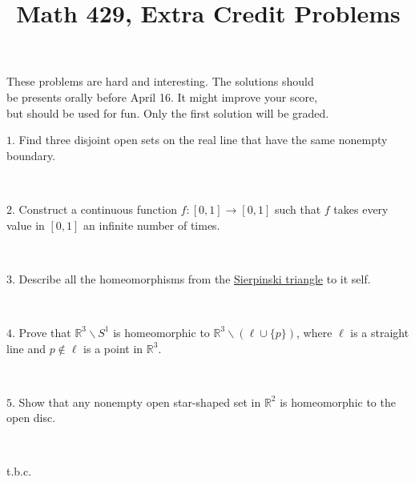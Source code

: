 \documentclass{article}
\def\noi{\noindent}%
\def\RR{\mathbb{R}}%
\def\:{\colon}
\begin{document}
\title{Math 429, Extra Credit Problems}
\author{}
\date{}
\maketitle

\begin{center}
{\small These problems are hard and interesting.
The solutions should \\
be presents orally before April 16.
It might improve your score,\\
but should be used for fun. Only the first solution will be graded.}
\end{center}
\thispagestyle{empty}




\noi $1$. 
Find three disjoint open sets on the real line 
that have the same nonempty boundary. 

\ 

\noi $2$. Construct a continuous function 
$f\:[0,1]\rightarrow [0,1]$ such that $f$ takes every value in $[0,1]$ 
an infinite number of times.

\ 

\noi $3$.
Describe all the homeomorphisms from the \href{http://en.wikipedia.org/wiki/Sierpinski_triangle}{Sierpinski triangle} to it self.

\ 

\noi $4$. Prove that $\RR^3\backslash S^1$ is homeomorphic to $\RR^3\backslash (\ell\cup \{p\})$, where $\ell$ is a straight line and $p\not\in\ell$ is a point in $\RR^3$.


\ 


\noi $5.$ Show that any nonempty open star-shaped set in $\RR^2$ is homeomorphic to the open disc.

\ 

\noi t.b.c.
\end{document}
